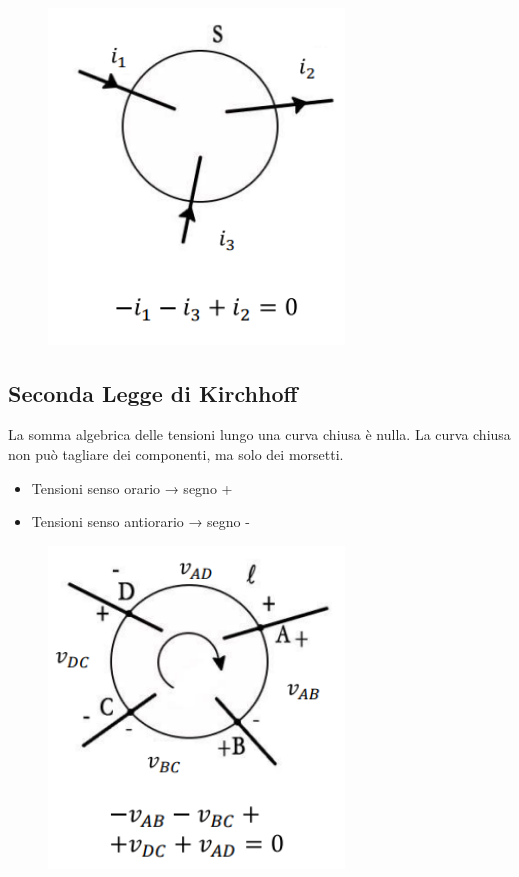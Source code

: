 \begin{figure}[H]
    \centering
    \includegraphics[width=0.7\textwidth]{capitoli/capitolo2/immagini/image4.png}
\end{figure}

\subsection*{Seconda Legge di Kirchhoff}
La somma algebrica delle tensioni lungo una curva chiusa è nulla. La curva chiusa non può tagliare dei componenti, ma solo dei morsetti.

\begin{itemize}
    \item Tensioni senso orario → segno +
    \item Tensioni senso antiorario → segno -
\end{itemize}

\begin{figure}[H]
    \centering
    \includegraphics[width=0.7\textwidth]{capitoli/capitolo2/immagini/image5.png}
\end{figure}

